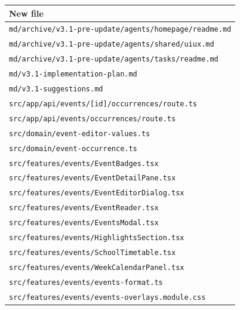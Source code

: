 \begin{longtable}{p{}}
\toprule New file \\
\midrule\endhead
\texttt{md/\allowbreak{}archive/\allowbreak{}v3.1-pre-update/\allowbreak{}agents/\allowbreak{}homepage/\allowbreak{}readme.md} \\
\texttt{md/\allowbreak{}archive/\allowbreak{}v3.1-pre-update/\allowbreak{}agents/\allowbreak{}shared/\allowbreak{}uiux.md} \\
\texttt{md/\allowbreak{}archive/\allowbreak{}v3.1-pre-update/\allowbreak{}agents/\allowbreak{}tasks/\allowbreak{}readme.md} \\
\texttt{md/\allowbreak{}v3.1-implementation-plan.md} \\
\texttt{md/\allowbreak{}v3.1-suggestions.md} \\
\texttt{src/\allowbreak{}app/\allowbreak{}api/\allowbreak{}events/\allowbreak{}[id]/\allowbreak{}occurrences/\allowbreak{}route.ts} \\
\texttt{src/\allowbreak{}app/\allowbreak{}api/\allowbreak{}events/\allowbreak{}occurrences/\allowbreak{}route.ts} \\
\texttt{src/\allowbreak{}domain/\allowbreak{}event-editor-values.ts} \\
\texttt{src/\allowbreak{}domain/\allowbreak{}event-occurrence.ts} \\
\texttt{src/\allowbreak{}features/\allowbreak{}events/\allowbreak{}EventBadges.tsx} \\
\texttt{src/\allowbreak{}features/\allowbreak{}events/\allowbreak{}EventDetailPane.tsx} \\
\texttt{src/\allowbreak{}features/\allowbreak{}events/\allowbreak{}EventEditorDialog.tsx} \\
\texttt{src/\allowbreak{}features/\allowbreak{}events/\allowbreak{}EventReader.tsx} \\
\texttt{src/\allowbreak{}features/\allowbreak{}events/\allowbreak{}EventsModal.tsx} \\
\texttt{src/\allowbreak{}features/\allowbreak{}events/\allowbreak{}HighlightsSection.tsx} \\
\texttt{src/\allowbreak{}features/\allowbreak{}events/\allowbreak{}SchoolTimetable.tsx} \\
\texttt{src/\allowbreak{}features/\allowbreak{}events/\allowbreak{}WeekCalendarPanel.tsx} \\
\texttt{src/\allowbreak{}features/\allowbreak{}events/\allowbreak{}events-format.ts} \\
\texttt{src/\allowbreak{}features/\allowbreak{}events/\allowbreak{}events-overlays.module.css} \\

\end{longtable}
